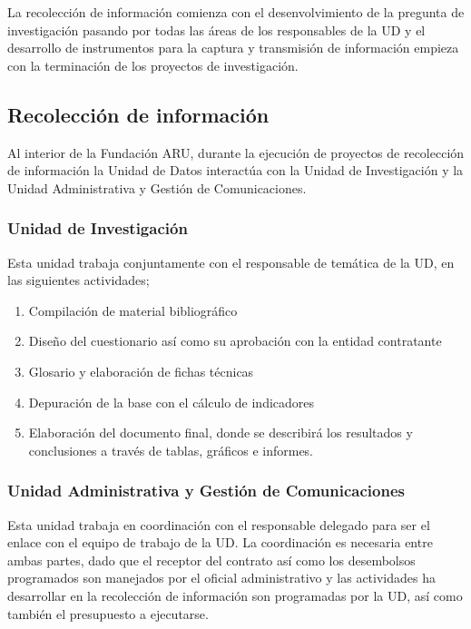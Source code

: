 \documentclass{article}
\begin{document}
La recolección de información comienza con el desenvolvimiento de la pregunta de investigación pasando por todas las áreas de los responsables de la UD y el desarrollo de instrumentos para la captura y transmisión de información empieza con la terminación de los proyectos de investigación.

\subsection{Recolección de información}

Al interior de la Fundación ARU, durante la ejecución de proyectos de recolección de información la Unidad de Datos interactúa con la Unidad de Investigación y la Unidad Administrativa y Gestión de Comunicaciones.


\subsubsection{Unidad de Investigación}

Esta unidad trabaja conjuntamente con el responsable de temática de la UD, en las siguientes actividades; 

\begin{enumerate}
\item Compilación de material bibliográfico
\item Diseño del cuestionario así como su aprobación con la entidad contratante
\item Glosario y elaboración de fichas técnicas
\item Depuración de la base con el cálculo de indicadores
\item Elaboración del documento final, donde se describirá los resultados y conclusiones a través de tablas, gráficos e informes.
\end{enumerate}

\subsubsection{Unidad Administrativa y Gestión de Comunicaciones}

Esta unidad trabaja en coordinación con el responsable delegado para ser el enlace con el equipo de trabajo de la UD. La coordinación es necesaria entre ambas partes, dado que el receptor del contrato así como los desembolsos programados son manejados por el oficial administrativo y las actividades ha desarrollar en la recolección de información son programadas por la UD, así como también el presupuesto a ejecutarse.\\
\end{document}
